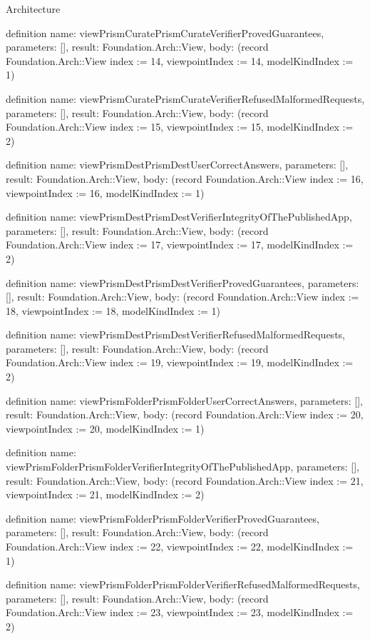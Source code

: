 \begin{lexlean}{Architecture}
\begin{semanticmodule}
definition{
  name: viewPrismCuratePrismCurateVerifierProvedGuarantees,
  parameters: [],
  result: Foundation.Arch::View,
  body: (record Foundation.Arch::View {index := 14, viewpointIndex := 14, modelKindIndex := 1})
}

definition{
  name: viewPrismCuratePrismCurateVerifierRefusedMalformedRequests,
  parameters: [],
  result: Foundation.Arch::View,
  body: (record Foundation.Arch::View {index := 15, viewpointIndex := 15, modelKindIndex := 2})
}

definition{
  name: viewPrismDestPrismDestUserCorrectAnswers,
  parameters: [],
  result: Foundation.Arch::View,
  body: (record Foundation.Arch::View {index := 16, viewpointIndex := 16, modelKindIndex := 1})
}

definition{
  name: viewPrismDestPrismDestVerifierIntegrityOfThePublishedApp,
  parameters: [],
  result: Foundation.Arch::View,
  body: (record Foundation.Arch::View {index := 17, viewpointIndex := 17, modelKindIndex := 2})
}

definition{
  name: viewPrismDestPrismDestVerifierProvedGuarantees,
  parameters: [],
  result: Foundation.Arch::View,
  body: (record Foundation.Arch::View {index := 18, viewpointIndex := 18, modelKindIndex := 1})
}

definition{
  name: viewPrismDestPrismDestVerifierRefusedMalformedRequests,
  parameters: [],
  result: Foundation.Arch::View,
  body: (record Foundation.Arch::View {index := 19, viewpointIndex := 19, modelKindIndex := 2})
}

definition{
  name: viewPrismFolderPrismFolderUserCorrectAnswers,
  parameters: [],
  result: Foundation.Arch::View,
  body: (record Foundation.Arch::View {index := 20, viewpointIndex := 20, modelKindIndex := 1})
}

definition{
  name: viewPrismFolderPrismFolderVerifierIntegrityOfThePublishedApp,
  parameters: [],
  result: Foundation.Arch::View,
  body: (record Foundation.Arch::View {index := 21, viewpointIndex := 21, modelKindIndex := 2})
}

definition{
  name: viewPrismFolderPrismFolderVerifierProvedGuarantees,
  parameters: [],
  result: Foundation.Arch::View,
  body: (record Foundation.Arch::View {index := 22, viewpointIndex := 22, modelKindIndex := 1})
}

definition{
  name: viewPrismFolderPrismFolderVerifierRefusedMalformedRequests,
  parameters: [],
  result: Foundation.Arch::View,
  body: (record Foundation.Arch::View {index := 23, viewpointIndex := 23, modelKindIndex := 2})
}


\end{semanticmodule}
\end{lexlean}
